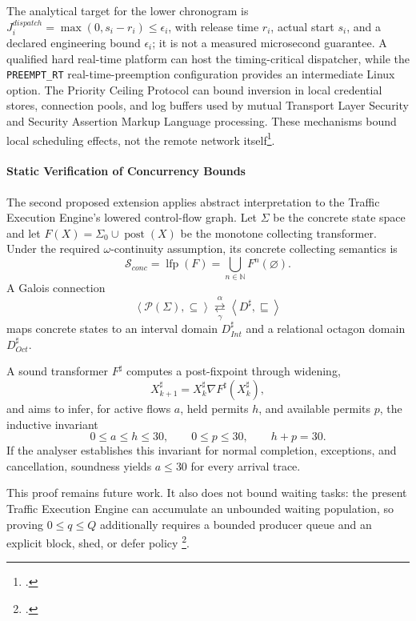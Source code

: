 \noindent The analytical target for the lower chronogram is
$J_i^{\mathit{dispatch}}=\max(0,s_i-r_i)\leq\epsilon_i$, with release time
$r_i$, actual start $s_i$, and a declared engineering bound $\epsilon_i$; it is
not a measured microsecond guarantee. A qualified hard real-time platform can host the timing-critical dispatcher, while
the \texttt{PREEMPT\_RT} real-time-preemption configuration provides an
intermediate Linux option. The Priority Ceiling Protocol can bound inversion in
local credential stores, connection pools, and log buffers used by mutual
Transport Layer Security and Security Assertion Markup Language processing.
These mechanisms bound local scheduling effects, not the remote network
itself\footcites{unipd-real-time-kernels-syllabus}
{liu-real-time-systems}{burns-wellings-analysable-real-time}.

\paragraph{Static Verification of Concurrency Bounds}
\noindent The second proposed extension applies abstract interpretation to the
Traffic Execution Engine's lowered control-flow graph. Let $\Sigma$ be the concrete
state space and let $F(X)=\Sigma_0\cup\operatorname{post}(X)$ be the monotone
collecting transformer. Under the required $\omega$-continuity assumption, its
concrete collecting semantics is
\begin{equation}
 \mathcal{S}_{\mathit{conc}}=\operatorname{lfp}(F)
   =\bigcup_{n\in\mathbb{N}}F^n(\varnothing).
\end{equation}
A Galois connection
\begin{equation}
 \left\langle\mathcal{P}(\Sigma),\subseteq\right\rangle
 \underset{\gamma}{\overset{\alpha}{\rightleftarrows}}
 \left\langle D^{\sharp},\sqsubseteq\right\rangle
\end{equation}
maps concrete states to an interval domain
$D_{\mathit{Int}}^{\sharp}$ and a relational octagon domain
$D_{\mathit{Oct}}^{\sharp}$.

\noindent A sound transformer $F^{\sharp}$ computes a
post-fixpoint through widening,
\begin{equation}
 X_{k+1}^{\sharp}=X_k^{\sharp}\nabla F^{\sharp}(X_k^{\sharp}),
\end{equation}
and aims to infer, for active flows $a$, held permits $h$, and available permits
$p$, the inductive invariant
\begin{equation}
 0\leq a\leq h\leq30,\qquad 0\leq p\leq30,\qquad h+p=30.
\end{equation}
If the analyser establishes this invariant for normal completion, exceptions,
and cancellation, soundness yields $a\leq30$ for every arrival trace.

\noindent This proof remains future work. It also does not bound waiting tasks:
the present Traffic Execution Engine can accumulate an unbounded waiting
population, so proving
$0\leq q\leq Q$ additionally requires a bounded producer queue and an explicit
block, shed, or defer policy
\footcites{unipd-software-verification-syllabus}{mine-numeric-invariants}.

\endgroup
\newpage
